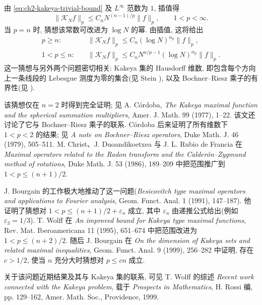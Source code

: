 \hypertarget{chapter-02-page-059}{}
由 \eqref{eq:ch2-kakeya-trivial-bound} 及 $L^\infty$ 范数为 $1$, 插值得
\[
 \|\mathcal K_Nf\|_p\le C_nN^{(n-1)/p}\|f\|_p,
 \qquad 1<p<\infty.
\]
当 $p=n$ 时, 猜想该常数可改进为 $\log N$ 的幂. 由插值, 这将给出
\[
 \begin{aligned}
 p\ge n:&\quad \|\mathcal K_Nf\|_p\le C_n(\log N)^{\alpha_p}\|f\|_p,\\
 1<p\le n:&\quad \|\mathcal K_Nf\|_p\le C_nN^{n/p-1}(\log N)^{\alpha_p}\|f\|_p.
 \end{aligned}
\]
这一猜想与另外两个问题密切相关: Kakeya 集的 Hausdorff 维数, 即包含每个方向上一条线段的 Lebesgue 测度为零的集合(见 Stein ), 以及 Bochner--Riesz 乘子的有界性(见 ).

该猜想仅在 $n=2$ 时得到完全证明; 见 A. Córdoba, \emph{The Kakeya maximal function and the spherical summation multipliers}, Amer. J. Math. 99 (1977), 1--22. 该文还讨论了它与 Bochner--Riesz 乘子的联系. Córdoba 后来证明了所有维数下 $1<p<2$ 的结果; 见 \emph{A note on Bochner--Riesz operators}, Duke Math. J. 46 (1979), 505--511. M. Christ、J. Duoandikoetxea 与 J. L. Rubio de Francia 在 \emph{Maximal operators related to the Radon transform and the Calderón--Zygmund method of rotations}, Duke Math. J. 53 (1986), 189--209 中把范围推广到 $1<p\le(n+1)/2$.

J. Bourgain 的工作极大地推动了这一问题(\emph{Besicovitch type maximal operators and applications to Fourier analysis}, Geom. Funct. Anal. 1 (1991), 147--187). 他证明了猜想对 $1<p\le(n+1)/2+\varepsilon_n$ 成立, 其中 $\varepsilon_n$ 由递推公式给出(例如 $\varepsilon_3=1/3$). T. Wolff 在 \emph{An improved bound for Kakeya type maximal functions}, Rev. Mat. Iberoamericana 11 (1995), 651--674 中把范围改进为 $1<p\le(n+2)/2$. 随后 J. Bourgain 在 \emph{On the dimension of Kakeya sets and related maximal inequalities}, Geom. Funct. Anal. 9 (1999), 256--282 中证明, 存在 $c>1/2$, 使当 $n$ 充分大时猜想对 $p\le cn$ 成立.

关于该问题近期结果及其与 Kakeya 集的联系, 可见 T. Wolff 的综述 \emph{Recent work connected with the Kakeya problem}, 载于 \emph{Prospects in Mathematics}, H. Rossi 编, pp. 129--162, Amer. Math. Soc., Providence, 1999.
